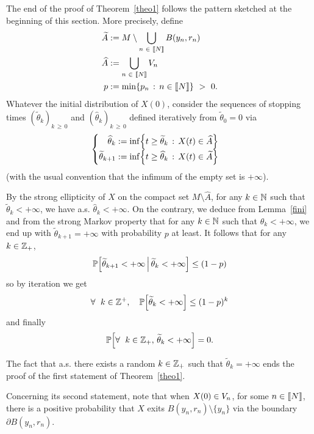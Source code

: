 \documentclass[10pt]{amsart}
\makeatletter
\theoremstyle{definition}\newtheorem{defi}[theo]{Definition}\newtheorem{rema}[theo]{Remark}\newtheorem{exam}[theo]{Example}\newtheorem{exem}[theo]{Example}\newtheorem{nota}[theo]{Notation}
\newcommand{\NN}{\mathbb{N}}
\newcommand{\PP}{\mathbb{P}}
\newcommand{\ZZ}{\mathbb{Z}}
\newcommand{\iy}{\infty}
\newcommand{\pa}{\partial}
\newcommand{\wi}{\widetilde}
\newcommand{\wit}{\widehat}
\newcommand{\fo}{\forall\ }
\let\originalleft\left
\let\originalright\right
\renewcommand{\left}{\mathopen{}\mathclose\bgroup\originalleft}
\renewcommand{\right}{\aftergroup\egroup\originalright}
\let\oldin\in
\renewcommand{\in}{\mathchoice{\oldin}{\oldin}{\,\oldin\,}{\,\oldin\,}}
\newenvironment{alcases}{\left\{\begingroup\arraycolsep=0pt\renewcommand{\arraystretch}{1.2}\begin{array}{r@{\;}l@{\quad}l}}{\end{array}\endgroup\right.}
\let\oldforall\forall
\renewcommand*{\forall}{\mathrel{\oldforall}}
\newcommand{\llbracket}{\mathopen{[\mkern -2.7mu[}}
\newcommand{\rrbracket}{\mathclose{]\mkern -2.7mu]}}
\newcommand{\lin}{\llbracket}
\newcommand{\rin}{\rrbracket}
\makeatother
\begin{document}
The end of the proof of Theorem~\ref{theo1} follows the pattern sketched at the beginning of this section. More precisely, define
\begin{align*}
\wi A&:= M\setminus \bigcup_{n\in\lin N\rin} B(y_n,r_n)\\
\wit A&:=  \bigcup_{n\in\lin N\rin} V_n\\
p&:=\min\{p_n\,:\, n\in\lin N\rin\}\ >\ 0.
\end{align*}
Whatever the initial distribution of $X(0)$, consider the sequences of stopping times $(\wi \theta_k)_{k\,\geq\,0}$ and $(\wit \theta_k)_{k\,\geq\,0}$ defined iteratively from $\wi\theta_0=0$ via
\begin{equation}\label{thetas}
\begin{alcases}
\wit \theta_k&:= \inf\left\{t\geq \wi\theta_k\,:\, X(t)\in \wit A\right\}\\[0.2em]
\wi \theta_{k+1}&:= \inf\left\{t\geq \wit\theta_k\,:\, X(t)\in \wi A\right\}
\end{alcases}
\end{equation}
(with the usual convention that the infimum of the empty set is $+\iy$).

By the strong ellipticity of $X$ on the compact set $M\setminus \wit A$, for any $k\in \NN$ such that $\wi \theta_k<+\iy$, we have a.s. $\wit \theta_k<+\iy$. On the contrary, we deduce from Lemma~\ref{fini} and from the strong Markov property that for any $k\in \NN$ such that $\wit \theta_k<+\iy$, we end up with $\wi \theta_{k+1}=+\iy$ with probability $p$ at least. It follows that for any $k\in\ZZ_+$,
\begin{equation*}
\PP\left[\wi \theta_{k+1}<+\iy\,\middle|\, \wi \theta_{k}<+\iy\right] \leq (1-p)
\end{equation*}
so by iteration we get
\begin{equation*}
\fo k\in\ZZ^+,\quad \PP\left[\wi \theta_{k}<+\iy\right]\leq (1-p)^k
\end{equation*} 
and finally
\begin{equation*}
\PP\left[\fo k\in\ZZ_+,\,\wi \theta_{k}<+\iy\right] = 0.
\end{equation*}


The fact that a.s. there exists a random $k\in\ZZ_+$ such that $\wi \theta_k=+\iy$ ends the proof of the first statement of Theorem~\ref{theo1}.

Concerning its second statement, note that when $X(0)\in V_n$, for some $n\in\lin N\rin$, there is a positive probability that $X$ exits $B(y_n,r_n)\setminus\{y_n\}$ via the boundary $\pa B(y_n,r_n)$.
\end{document}
